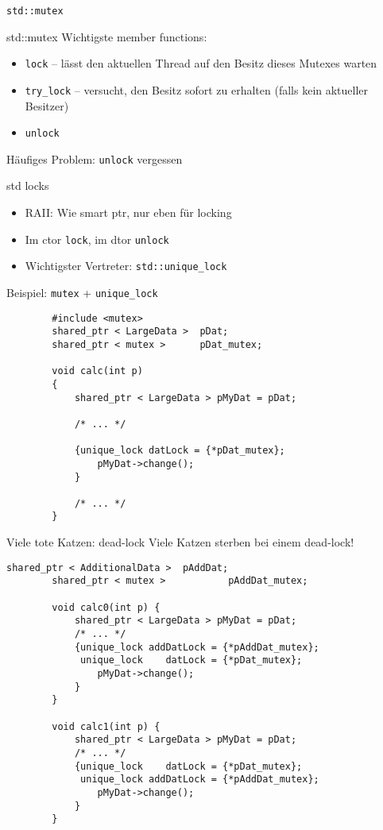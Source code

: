 \begin{frame}{ \texttt{std::mutex} }
	\begin{block}{std::mutex}
		Wichtigste member functions:
		\begin{itemize}
			\item \texttt{lock} -- lässt den aktuellen Thread auf den Besitz dieses Mutexes warten
			\item \texttt{try\_lock} -- versucht, den Besitz sofort zu erhalten (falls kein aktueller Besitzer)
			\item \texttt{unlock}
		\end{itemize}
	\end{block}
	
	\pause
	
	\alert{Häufiges Problem: \texttt{unlock} vergessen}
	\begin{block}{std locks}
		\begin{itemize}
			\item RAII: Wie smart ptr, nur eben für locking
			\item Im ctor \texttt{lock}, im dtor \texttt{unlock}
			\item Wichtigster Vertreter: \texttt{std::unique\_lock}
		\end{itemize}
	\end{block}
\end{frame}

\begin{frame}[fragile]{ Beispiel: \texttt{mutex} + \texttt{unique\_lock} }
	\begin{lstlisting}
		#include <mutex>
		shared_ptr < LargeData >  pDat;
		shared_ptr < mutex >      pDat_mutex;
		
		void calc(int p)
		{
			shared_ptr < LargeData > pMyDat = pDat;
			
			/* ... */
			
			{unique_lock datLock = {*pDat_mutex};
				pMyDat->change();
			}
			
			/* ... */
		}
	\end{lstlisting}
\end{frame}

\begin{frame}[fragile]{ Viele tote Katzen: dead-lock }
	\alert{Viele Katzen sterben bei einem dead-lock!}
	
	\begin{lstlisting}[basicstyle=\scriptsize]
		shared_ptr < AdditionalData >  pAddDat;
		shared_ptr < mutex >           pAddDat_mutex;
		
		void calc0(int p) {
			shared_ptr < LargeData > pMyDat = pDat;
			/* ... */
			{unique_lock addDatLock = {*pAddDat_mutex};
			 unique_lock    datLock = {*pDat_mutex};
				pMyDat->change();
			}
		}
		
		void calc1(int p) {
			shared_ptr < LargeData > pMyDat = pDat;
			/* ... */
			{unique_lock    datLock = {*pDat_mutex};
			 unique_lock addDatLock = {*pAddDat_mutex};
				pMyDat->change();
			}
		}
	\end{lstlisting}
\end{frame}


